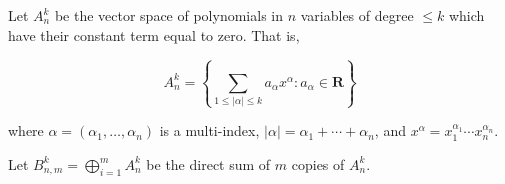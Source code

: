 Let $A_n^k$ be the vector space of polynomials in $n$ variables of degree $\leq k$ which have their constant term equal to zero. That is,

$$A_n^k = \left\{ \sum_{1 \leq |\alpha| \leq k} a_\alpha x^\alpha : a_\alpha \in \mathbf{R} \right\}$$

where $\alpha = (\alpha_1, \ldots, \alpha_n)$ is a multi-index, $|\alpha| = \alpha_1 + \cdots + \alpha_n$, and $x^\alpha = x_1^{\alpha_1} \cdots x_n^{\alpha_n}$.

Let $B_{n,m}^k = \bigoplus_{i=1}^{m} A_n^k$ be the direct sum of $m$ copies of $A_n^k$.
